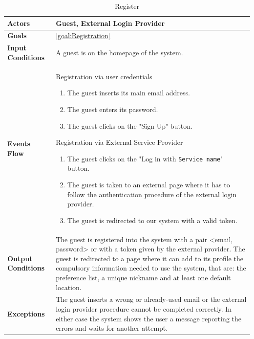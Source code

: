 \begin{table}[H]
	\centering
	\def\arraystretch{1.5}
	\begin{tabular}{|p{7cm}|p{7cm}|}
		\hline
		\textbf{Actors}            & Guest, External Login Provider		    \\ \hline
		\textbf{Goals}             & \ref{goal:Registration}           \\ \hline
		\textbf{Input Conditions}  & A guest is on the homepage of the system.           \\ \hline
		\textbf{Events Flow}       &   
		Registration via user credentials
		\begin{enumerate}
			\item The guest inserts its main email address.
			\item The guest enters its password.
			\item The guest clicks on the "Sign Up" button.
		\end{enumerate}
		Registration via External Service Provider
		\begin{enumerate}
			\item The guest clicks on the "Log in with \texttt{Service name}" button.
			\item The guest is taken to an external page where it has to follow the authentication procedure of the external login provider.
			\item The guest is redirected to our system with a valid token.
		\end{enumerate}       \\ \hline
		\textbf{Output Conditions} & The guest is registered into the system with a pair <email, password> or with a token given by the external provider. The guest is redirected to a page where it can add to its profile the compulsory information needed to use the system, that are: the preference list, a unique nickname and at least one default location.      \\ \hline
		\textbf{Exceptions}        & The guest inserts a wrong or already-used email or the external login provider procedure cannot be completed correctly. In either case the system shows the user a message reporting the errors and waits for another attempt.            \\ \hline
	\end{tabular}
	\caption{Register}
\end{table}

